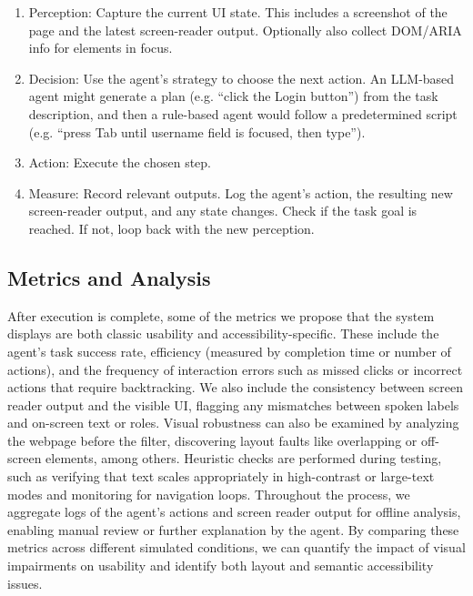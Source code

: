 \begin{enumerate}
    \item Perception: Capture the current UI state. This includes a screenshot of the page and the latest screen-reader output. Optionally also collect DOM/ARIA info for elements in focus. 
    \item Decision: Use the agent's strategy to choose the next action. An LLM-based agent might generate a plan (e.g. “click the Login button”) from the task description, and then a rule-based agent would follow a predetermined script (e.g. “press Tab until username field is focused, then type”).
    \item Action: Execute the chosen step.
    \item Measure: Record relevant outputs. Log the agent's action, the resulting new screen-reader output, and any state changes. Check if the task goal is reached. If not, loop back with the new perception.
\end{enumerate}



\subsection{Metrics and Analysis}

After execution is complete, some of the metrics we propose that the system displays are both classic usability and accessibility-specific. These include the agent's task success rate, efficiency (measured by completion time or number of actions), and the frequency of interaction errors such as missed clicks or incorrect actions that require backtracking. We also include the consistency between screen reader output and the visible UI, flagging any mismatches between spoken labels and on-screen text or roles. Visual robustness can also be examined by analyzing the webpage before the filter, discovering layout faults like overlapping or off-screen elements, among others. Heuristic checks are performed during testing, such as verifying that text scales appropriately in high-contrast or large-text modes and monitoring for navigation loops. Throughout the process, we aggregate logs of the agent's actions and screen reader output for offline analysis, enabling manual review or further explanation by the agent. By comparing these metrics across different simulated conditions, we can quantify the impact of visual impairments on usability and identify both layout and semantic accessibility issues.


